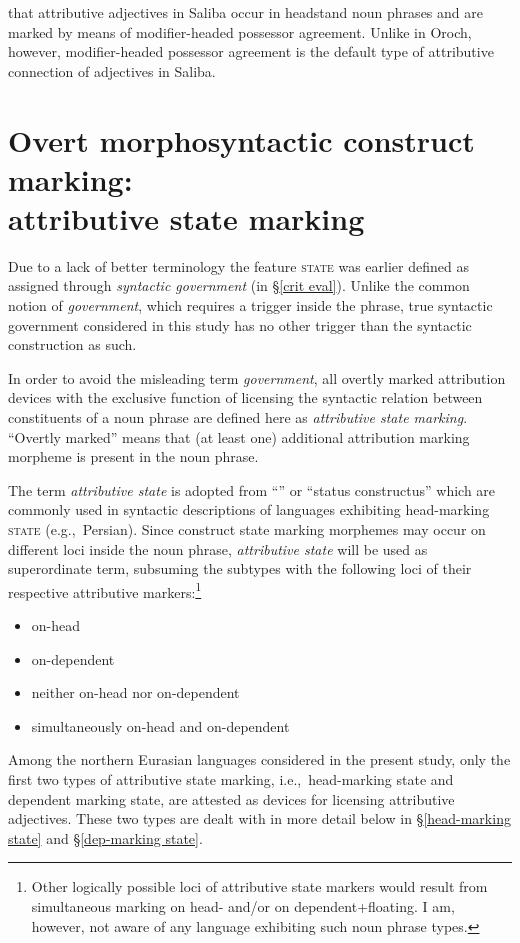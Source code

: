  that attributive adjectives in Saliba occur in headstand noun phrases and are marked by means of modifier\hyp{}headed possessor agreement. Unlike in Oroch, however, modifier\hyp{}headed possessor agreement is the default type of attributive connection of adjectives in Saliba.

\section[Attributive state marking]{Overt morphosyntactic construct marking:\\attributive state marking}

Due to a lack of better terminology the feature \textsc{state} was earlier defined as assigned through \emph{syntactic government} (in \S\ref{crit eval}). Unlike the common notion of \emph{government}, which requires a trigger inside the phrase, true syntactic government considered in this study has no other trigger than the syntactic construction as such.

In order to avoid the misleading term \emph{government}, all overtly marked attribution devices with the exclusive function of licensing the syntactic relation between constituents of a noun phrase are defined here as \emph{attributive state marking}. “Overtly marked” means that (at least one) additional attribution marking morpheme is present in the noun phrase.

The term \emph{attributive state} is adopted from “” or “status constructus” which are commonly used in syntactic descriptions of languages exhibiting head-marking \textsc{state} (e.g.,~Persian). Since construct state marking morphemes may occur on different loci inside the noun phrase, \emph{attributive state} will be used as superordinate term, subsuming the subtypes with the following loci of their respective attributive markers:\footnote{Other logically possible loci of attributive state markers would result from simultaneous marking on head- and\slash{}or on dependent+floating. I am, however, not aware of any language exhibiting such noun phrase types.}
\begin{itemize}
\settowidth{}
\item on-head 
\item on-dependent 
\item neither on-head nor on-dependent 
\item simultaneously on-head and on-dependent 
\end{itemize}
Among the northern Eurasian languages considered in the present study, only the first two types of attributive state marking, i.e.,~head-marking state and dependent marking state, are attested as devices for licensing attributive adjectives. These two types are dealt with in more detail below in \S\ref{head-marking state} and \S\ref{dep-marking state}.

